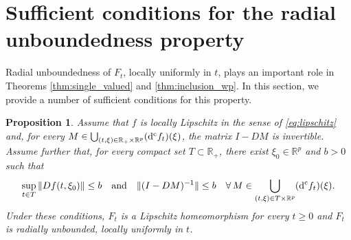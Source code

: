 \documentclass[a4paper,11pt]{article}
\newcommand{\R}{\mathbb R}
\numberwithin{equation}{section}
\numberwithin{figure}{section}
\numberwithin{table}{section}
\newtheorem{proposition}[theorem]{Proposition}
\begin{document}
\section{Sufficient conditions for the radial unboundedness property}\label{sec:radial_unboundedness}
%
Radial unboundedness of $F_t$, locally uniformly in $t$, plays an important role
in Theorems \ref{thm:single_valued} and \ref{thm:inclusion_wp}. In this section,
we provide a number of sufficient conditions for this property.
\begin{proposition}\label{pro:radial_unboundedness_diff}
Assume that $f$ is locally Lipschitz in the sense of \eqref{eq:lipschitz} and, for every $M\in
\bigcup_{(t,\xi)\in\R_+\times\R^p}({\rm d^{\rm c}}f_t)(\xi)$, the matrix $I-DM$ is invertible. Assume further that,
for every compact set $T\subset\R_+$, there exist $\xi_0\in\R^p$ and $b>0$ such that
\begin{equation}\label{eq:radial_unboundedness_diff}
\sup_{t\in T}\|Df(t,\xi_0)\|\leq b\quad\mbox{and}\quad \|(I-DM)^{-1}\|\leq b\quad
\forall\,M\in\bigcup_{(t,\xi)\in T\times\R^p}({\rm d}^{\rm c}f_t)(\xi).
\end{equation}
Under these conditions, $F_t$ is a Lipschitz homeomorphism for every $t\geq 0$ and $F_t$ is radially unbounded, locally uniformly in $t$.
\end{proposition}
%
\end{document}
